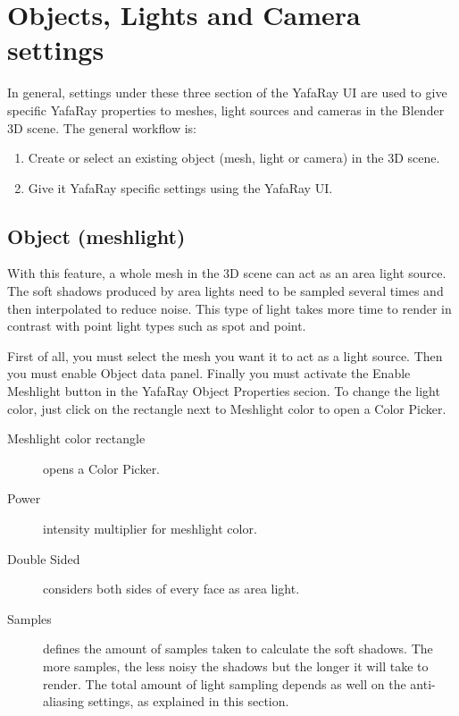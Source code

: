 \chapter{Objects, Lights and Camera settings}\label{chapter:olc}
In general, settings under these three section of the YafaRay UI are used to give specific YafaRay properties to meshes, light sources and cameras in the Blender 3D scene. The general workflow is:
\begin{enumerate}
\item Create or select an existing object (mesh, light or camera) in the 3D scene.
\item Give it YafaRay specific settings using the YafaRay UI.
\end{enumerate}

\section{Object (meshlight)}
With this feature, a whole mesh in the 3D scene can act as an area light source. The soft shadows produced by area lights need to be sampled several times and then interpolated to reduce noise. This type of light takes more time to render in contrast with point light types such as spot and point.

First of all, you must select the mesh you want it to act as a light source. Then you must enable Object data panel. Finally you must activate the Enable Meshlight button in the YafaRay Object Properties secion. To change the light color, just click on the rectangle next to Meshlight color to open a Color Picker.

\begin{description}
\item[Meshlight color rectangle] opens a Color Picker.
\item[Power] intensity multiplier for meshlight color.
\item[Double Sided] considers both sides of every face as area light.
\item[Samples] defines the amount of samples taken to calculate the soft shadows. The more samples, the less noisy the shadows but the longer it will take to render. The total amount of light sampling depends as well on the anti-aliasing settings, as explained in this section.
\end{description}



